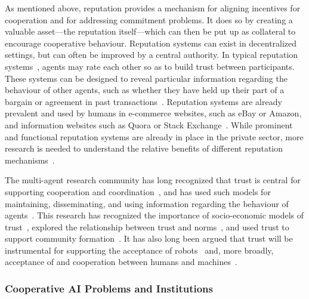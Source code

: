 \documentclass[11pt, a4paper, logo, onecolumn, nonumbering]{deepmind}
\begin{document}
As mentioned above, reputation provides a mechanism for aligning incentives for cooperation and for addressing commitment problems. It does so by creating a valuable asset---the reputation itself---which can then be put up as collateral to encourage cooperative behaviour. Reputation systems can exist in decentralized settings, but can often be improved by a central authority.  In typical reputation systems~\cite{resnick2002trust,marti2006taxonomy,sabater2005review,fulmer2012level,sherchan2013survey,pinyol2013computational,lu2018bars}, agents may rate each other so as to build trust between participants. These systems can be designed to reveal particular information regarding the behaviour of other agents, such as whether they have held up their part of a bargain or agreement in past transactions~\cite{fullam2005specification,jurca2009mechanisms,teacy2006travos,ramchurn2004trust}. Reputation systems are already prevalent and used by humans in e-commerce websites, such as eBay or Amazon, and information websites such as Quora or Stack Exchange~\cite{dellarocas2003digitization,leskovec2007dynamics}. While prominent and functional reputation systems are already in place in the private sector, more research is needed to understand the relative benefits of different reputation mechanisms~\cite{hazard2013macau}.







The multi-agent research community has long recognized that trust is central for supporting cooperation and coordination~\cite{castelfranchi1998principles,wang2007formal,sen2013comprehensive,cohen2019trusted}, and has used such models for maintaining, disseminating, and using information regarding the behaviour of agents~\cite{josang2009challenges,yu2013survey}. 
This research has recognized the importance of socio-economic models of trust~\cite{mayer1995integrative}, explored the relationship between trust and norms~\cite{luck2009flexible}, and used trust to support community formation~\cite{kastidou2009exchanging}.  It has also long been argued that trust will be instrumental for supporting the acceptance of robots~\cite{kaminka2013curing} and, more broadly, acceptance of and cooperation between humans and machines~\cite{melo2016people,de2017negotiating}.




\subsubsection{Cooperative AI Problems and Institutions}
\end{document}

